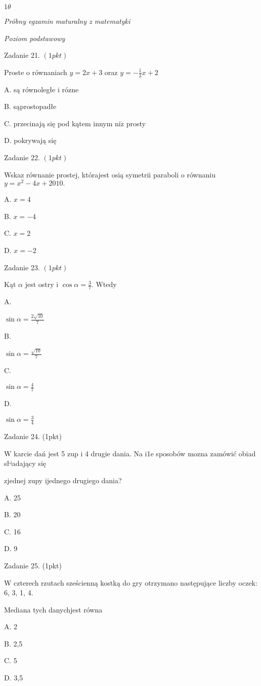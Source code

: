 \documentclass[a4paper,12pt]{article}
\begin{document}
$ 1\theta$

{\it Próbny egzamin maturalny z matematyki}

{\it Poziom podstawowy}

Zadanie 21. $(1pkt)$

Proste o równaniach $y=2x+3$ oraz $y=-\displaystyle \frac{1}{3}x+2$

A. są równoległe i rózne

B. sąprostopadłe

C. przecinają się pod kątem innym $\mathrm{n}\mathrm{i}\dot{\mathrm{z}}$ prosty

D. pokrywają się

Zadanie 22. $(1pkt)$

Wskaz równanie prostej, którajest osią symetrii paraboli o równaniu $y=x^{2}-4x+2010.$

A. $x=4$

B. $x=-4$

C. $x=2$

D. $x=-2$

Zadanie 23. $(1pkt)$

Kąt $\alpha$ jest ostry i $\displaystyle \cos\alpha=\frac{3}{7}$. Wtedy

A.

$\displaystyle \sin\alpha=\frac{2\sqrt{10}}{7}$

B.

$\displaystyle \sin\alpha=\frac{\sqrt{10}}{7}$

C.

$\displaystyle \sin\alpha=\frac{4}{7}$

D.

$\displaystyle \sin\alpha=\frac{3}{4}$

Zadanie 24. (1pkt)

W karcie dań jest 5 zup i 4 drugie dania. Na i1e sposobów mozna zamówić obiad s$\mathbb{H}$adający się

zjednej zupy ijednego drugiego dania?

A. 25

B. 20

C. 16

D. 9

Zadanie 25. (1pkt)

W czterech rzutach sześcienną kostką do gry otrzymano następujące liczby oczek: 6, 3, 1, 4.

Mediana tych danychjest równa

A. 2

B. 2,5

C. 5

D. 3,5
\end{document}
